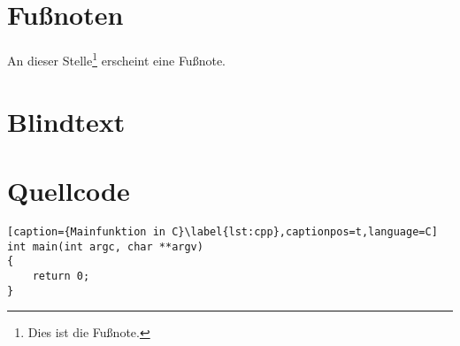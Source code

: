 \section{Fußnoten}
\label{sec:Fussnoten}

An dieser Stelle\footnote[42]{Dies ist die Fußnote.} erscheint eine Fußnote.

\section{Blindtext}
\label{sec:Blindtext}

\lipsum[1-2]

\section{Quellcode}
\label{sec:Quellcode}

\begin{lstlisting}[caption={Mainfunktion in C}\label{lst:cpp},captionpos=t,language=C]
int main(int argc, char **argv)
{
	return 0;
}
\end{lstlisting}